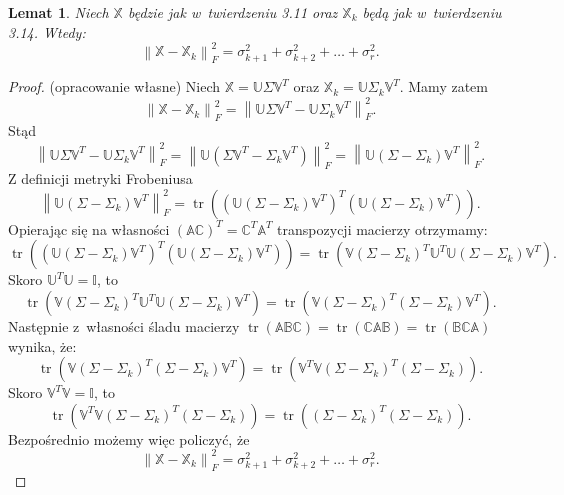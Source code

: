 \documentclass[12pt,a4paper]{report}
\newtheorem{lemat}[df]{Lemat}
\newcommand{\norma}[1]{\left\| {#1} \right\|}
\newcommand{\tr}[1]{\operatorname{tr}\left({#1} \right)}
\begin{document}
\begin{lemat}
Niech $\mathbb{X}$ będzie jak w~twierdzeniu 3.11 oraz $\mathbb{X}_k$ będą jak w~twierdzeniu 3.14.
Wtedy:
$$
\norma{ \mathbb{X} - \mathbb{X}_k}_F^2 = \sigma_{k+1}^2 + \sigma_{k+2}^2 + \ldots + \sigma_{r}^2.
$$
\end{lemat}
\begin{proof}(opracowanie własne)
Niech $\mathbb{X}=\mathbb{U} \Sigma \mathbb{V}^T$ oraz $\mathbb{X}_k=\mathbb{U} \Sigma_k \mathbb{V}^T$.
Mamy zatem
$$
\norma{ \mathbb{X} - \mathbb{X}_k}_F^2 =
\norma{\mathbb{U} \Sigma \mathbb{V}^T - \mathbb{U} \Sigma_k \mathbb{V}^T}_F^2.
$$
Stąd
$$
\norma{\mathbb{U} \Sigma \mathbb{V}^T - \mathbb{U} \Sigma_k \mathbb{V}^T}_F^2 = 
\norma{\mathbb{U} (\Sigma \mathbb{V}^T - \Sigma_k \mathbb{V}^T)}_F^2 = 
\norma{\mathbb{U} (\Sigma - \Sigma_k) \mathbb{V}^T}_F^2.
$$
Z definicji metryki Frobeniusa
$$
\norma{\mathbb{U} (\Sigma - \Sigma_k) \mathbb{V}^T}_F^2 = 
\tr{(\mathbb{U} (\Sigma - \Sigma_k) \mathbb{V}^T)^T (\mathbb{U} (\Sigma - \Sigma_k) \mathbb{V}^T)}.
$$
Opierając się na własności $(\mathbb{A}\mathbb{C})^T = \mathbb{C}^T \mathbb{A}^T$ transpozycji macierzy otrzymamy:
$$
\tr{(\mathbb{U} (\Sigma - \Sigma_k) \mathbb{V}^T)^T (\mathbb{U} (\Sigma - \Sigma_k) \mathbb{V}^T)} = \tr{\mathbb{V} (\Sigma - \Sigma_k)^T \mathbb{U}^T \mathbb{U} (\Sigma - \Sigma_k) \mathbb{V}^T}.
$$
Skoro $\mathbb{U}^T \mathbb{U} = \mathbb{I}$, to
$$
\tr{\mathbb{V} (\Sigma - \Sigma_k)^T \mathbb{U}^T \mathbb{U} (\Sigma - \Sigma_k) \mathbb{V}^T} = 
\tr{\mathbb{V} (\Sigma - \Sigma_k)^T (\Sigma - \Sigma_k) \mathbb{V}^T}.
$$
Następnie z~własności śladu macierzy $\tr{\mathbb{A} \mathbb{B} \mathbb{C}}  = \tr{\mathbb{C} \mathbb{A} \mathbb{B}} = \tr{\mathbb{B} \mathbb{C} \mathbb{A}}$ wynika, że:
$$
\tr{\mathbb{V} (\Sigma - \Sigma_k)^T (\Sigma - \Sigma_k) \mathbb{V}^T} = \tr{\mathbb{V}^T \mathbb{V} (\Sigma - \Sigma_k)^T (\Sigma - \Sigma_k)}.
$$ 
Skoro $\mathbb{V}^T \mathbb{V} = \mathbb{I}$, to
$$
\tr{\mathbb{V}^T \mathbb{V} (\Sigma - \Sigma_k)^T (\Sigma - \Sigma_k)} = \tr{(\Sigma - \Sigma_k)^T (\Sigma - \Sigma_k) }.
$$
Bezpośrednio możemy więc policzyć, że
$$
\norma{ \mathbb{X} - \mathbb{X}_k}_F^2 = \sigma_{k+1}^2 + \sigma_{k+2}^2 + \ldots + \sigma_{r}^2.
$$
\end{proof}
\end{document}

